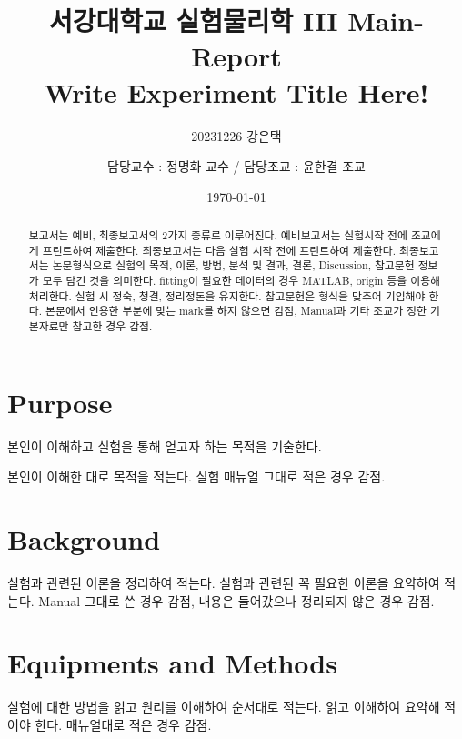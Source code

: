 \documentclass[10pt,aps,twocolumn]{revtex4-2}
\begin{document}
\title{서강대학교 실험물리학 III Main-Report\\ Write Experiment Title Here!}

\author{20231226 강은택}

\author{담당교수 : 정명화 교수 /  담당조교 : 윤한결 조교}


\date{\today}

\begin{abstract}
보고서는 예비, 최종보고서의 2가지 종류로 이루어진다. 예비보고서는 실험시작 전에 조교에게 프린트하여 제출한다. 최종보고서는 다음 실험 시작 전에 프린트하여 제출한다. 최종보고서는 논문형식으로 실험의 목적, 이론, 방법, 분석 및 결과, 결론, Discussion, 참고문헌 정보가 모두 담긴 것을 의미한다. fitting이 필요한 데이터의 경우 MATLAB, origin 등을 이용해 처리한다. 실험 시 정숙, 청결, 정리정돈을 유지한다. 참고문헌은 형식을 맞추어 기입해야 한다. 본문에서 인용한 부분에 맞는 mark를 하지 않으면 감점, Manual과 기타 조교가 정한 기본자료만 참고한 경우 감점.
\end{abstract}




\maketitle

\section{Purpose}

본인이 이해하고 실험을 통해 얻고자 하는 목적을 기술한다.

본인이 이해한 대로 목적을 적는다. 실험 매뉴얼 그대로 적은 경우 감점.


\section{Background}

실험과 관련된 이론을 정리하여 적는다. 실험과 관련된 꼭 필요한 이론을 요약하여 적는다. Manual 그대로 쓴 경우 감점, 내용은 들어갔으나 정리되지 않은 경우 감점.

\section{Equipments and Methods}

실험에 대한 방법을 읽고 원리를 이해하여 순서대로 적는다. 읽고 이해하여 요약해 적어야 한다. 매뉴얼대로 적은 경우 감점.
\end{document}
